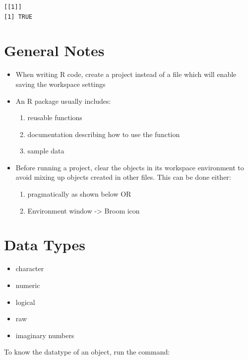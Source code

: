 \documentclass[
  letterpaper,
  DIV=11,
  numbers=noendperiod]{scrreprt}
\providecommand{\tightlist}{%
  \setlength{\itemsep}{0pt}\setlength{\parskip}{0pt}}\usepackage{longtable,booktabs,array}
\begin{document}
\begin{verbatim}
[[1]]
[1] TRUE
\end{verbatim}

\section{General Notes}\label{general-notes}

\begin{itemize}
\tightlist
\item
  When writing R code, create a project instead of a file which will
  enable saving the workspace settings
\item
  An R package usually includes:

  \begin{enumerate}
  \def\labelenumi{\alph{enumi}.}
  \tightlist
  \item
    reusable functions
  \item
    documentation describing how to use the function
  \item
    sample data
  \end{enumerate}
\item
  Before running a project, clear the objects in its workspace
  environment to avoid mixing up objects created in other files. This
  can be done either:

  \begin{enumerate}
  \def\labelenumi{\alph{enumi}.}
  \tightlist
  \item
    pragmatically as shown below OR
  \item
    Environment window -\textgreater{} Broom icon
  \end{enumerate}
\end{itemize}

\section{Data Types}\label{data-types}

\begin{itemize}
\tightlist
\item
  character
\item
  numeric
\item
  logical
\item
  raw
\item
  imaginary numbers
\end{itemize}

To know the datatype of an object, run the command:
\end{document}
